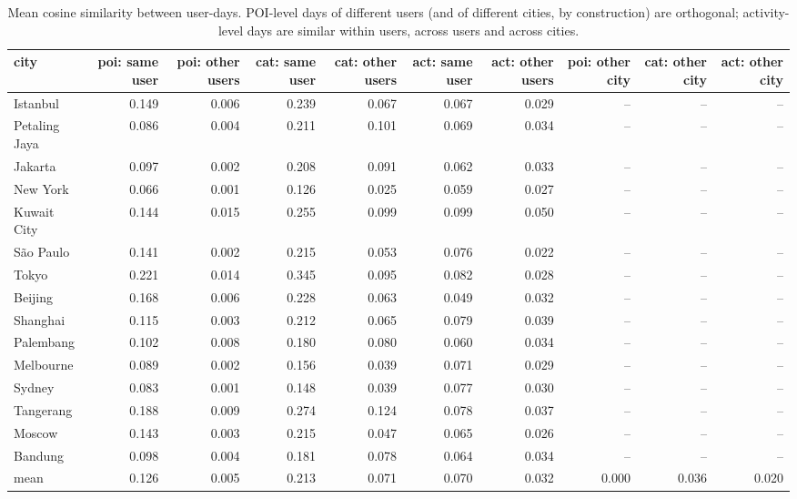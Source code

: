 \begin{table}[t]
\centering\small
\caption{Mean cosine similarity between user-days. POI-level days of different users (and of different cities, by construction) are orthogonal; activity-level days are similar within users, across users and across cities.}
\label{tab:A3_cosine}
\begin{tabular}{lrrrrrrrrr}
\toprule
city & poi: same user & poi: other users & cat: same user & cat: other users & act: same user & act: other users & poi: other city & cat: other city & act: other city \\
\midrule
Istanbul & 0.149 & 0.006 & 0.239 & 0.067 & 0.067 & 0.029 & -- & -- & -- \\
Petaling Jaya & 0.086 & 0.004 & 0.211 & 0.101 & 0.069 & 0.034 & -- & -- & -- \\
Jakarta & 0.097 & 0.002 & 0.208 & 0.091 & 0.062 & 0.033 & -- & -- & -- \\
New York & 0.066 & 0.001 & 0.126 & 0.025 & 0.059 & 0.027 & -- & -- & -- \\
Kuwait City & 0.144 & 0.015 & 0.255 & 0.099 & 0.099 & 0.050 & -- & -- & -- \\
São Paulo & 0.141 & 0.002 & 0.215 & 0.053 & 0.076 & 0.022 & -- & -- & -- \\
Tokyo & 0.221 & 0.014 & 0.345 & 0.095 & 0.082 & 0.028 & -- & -- & -- \\
Beijing & 0.168 & 0.006 & 0.228 & 0.063 & 0.049 & 0.032 & -- & -- & -- \\
Shanghai & 0.115 & 0.003 & 0.212 & 0.065 & 0.079 & 0.039 & -- & -- & -- \\
Palembang & 0.102 & 0.008 & 0.180 & 0.080 & 0.060 & 0.034 & -- & -- & -- \\
Melbourne & 0.089 & 0.002 & 0.156 & 0.039 & 0.071 & 0.029 & -- & -- & -- \\
Sydney & 0.083 & 0.001 & 0.148 & 0.039 & 0.077 & 0.030 & -- & -- & -- \\
Tangerang & 0.188 & 0.009 & 0.274 & 0.124 & 0.078 & 0.037 & -- & -- & -- \\
Moscow & 0.143 & 0.003 & 0.215 & 0.047 & 0.065 & 0.026 & -- & -- & -- \\
Bandung & 0.098 & 0.004 & 0.181 & 0.078 & 0.064 & 0.034 & -- & -- & -- \\
mean & 0.126 & 0.005 & 0.213 & 0.071 & 0.070 & 0.032 & 0.000 & 0.036 & 0.020 \\
\bottomrule
\end{tabular}
\end{table}
